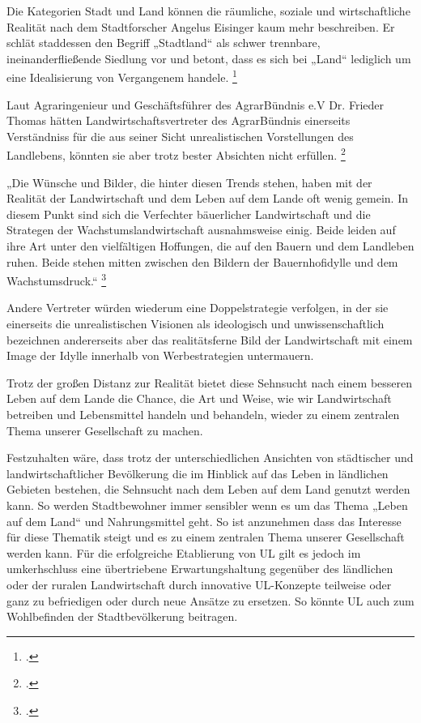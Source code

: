 \documentclass{scrartcl}
\begin{document}
Die Kategorien Stadt und Land können die räumliche, soziale und wirtschaftliche Realität nach dem Stadtforscher Angelus Eisinger kaum mehr beschreiben. Er schlät staddessen den Begriff „Stadtland“ als schwer trennbare, ineinanderfließende Siedlung vor und betont, dass es sich bei „Land“ lediglich um eine Idealisierung von Vergangenem handele. \footcite[Vgl.][S. 40]{Egnolff2015DieIdeal}

Laut Agraringenieur und Geschäftsführer des AgrarBündnis e.V Dr. Frieder Thomas hätten Landwirtschaftsvertreter des AgrarBündnis einerseits Verständniss für die aus seiner Sicht unrealistischen Vorstellungen des Landlebens, könnten sie aber trotz bester Absichten nicht erfüllen. \footcite[Vgl.][S. 27]{Thomas2015BauerlichkeitBegriff}

\begin{displayquote}
„Die Wünsche und Bilder, die hinter diesen Trends stehen, haben mit der Realität der Landwirtschaft und dem Leben auf dem Lande oft wenig gemein. In diesem Punkt sind sich die Verfechter bäuerlicher Landwirtschaft und die Strategen der Wachstumslandwirtschaft ausnahmsweise einig. Beide leiden auf ihre Art unter den vielfältigen Hoffungen, die auf den Bauern und dem Landleben ruhen. Beide stehen mitten zwischen den Bildern der Bauernhofidylle und dem Wachstumsdruck.“ \footcite[S. 27]{Thomas2015BauerlichkeitBegriff}
\end{displayquote}

Andere Vertreter würden wiederum eine Doppelstrategie verfolgen, in der sie einerseits die unrealistischen Visionen als ideologisch und unwissenschaftlich bezeichnen andererseits aber das realitätsferne Bild der Landwirtschaft mit einem Image der Idylle innerhalb von Werbestrategien untermauern.

Trotz der großen Distanz zur Realität bietet diese Sehnsucht nach einem besseren Leben auf dem Lande die Chance, die Art und Weise, wie wir Landwirtschaft betreiben und Lebensmittel handeln und behandeln, wieder zu einem zentralen Thema unserer Gesellschaft zu machen.

Festzuhalten wäre, dass trotz der unterschiedlichen Ansichten von städtischer und landwirtschaftlicher Bevölkerung die im Hinblick auf das Leben in ländlichen Gebieten bestehen, die Sehnsucht nach dem Leben auf dem Land genutzt werden kann. So werden Stadtbewohner immer sensibler wenn es um das Thema „Leben auf dem Land“ und Nahrungsmittel geht. So ist anzunehmen dass das Interesse für diese Thematik steigt und es zu einem zentralen Thema unserer Gesellschaft werden kann. Für die erfolgreiche Etablierung von UL gilt es jedoch im umkerhschluss eine übertriebene Erwartungshaltung gegenüber des ländlichen oder der ruralen Landwirtschaft durch innovative UL-Konzepte teilweise oder ganz zu befriedigen oder durch neue Ansätze zu ersetzen. So könnte UL auch zum Wohlbefinden der Stadtbevölkerung beitragen.
\end{document}

